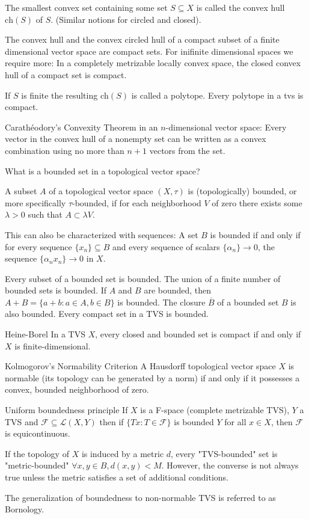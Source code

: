 The smallest convex set containing some set \( S \subseteq X \) is called the convex hull \( \text{ch}(S) \) of \( S \).
(Similar notions for circled and closed).

The convex hull and the convex circled hull of a compact subset
of a finite dimensional vector space are compact sets.
For inifinite dimensional spaces we require more:
In a completely metrizable locally convex space, 
the closed convex hull of a compact set is compact.

If \( S \) is finite the resulting \( \text{ch}(S) \) is called a polytope.
Every polytope in a tvs is compact.

Carathéodory’s Convexity Theorem in an \( n \)-dimensional vector space:
Every vector in the convex hull of a nonempty set can be written as a convex
combination using no more than \( n+1 \) vectors from the set.



What is a bounded set in a topological vector space?

A subset \( A \) of a topological vector space \( (X, \tau) \) is (topologically)
bounded, or more speciﬁcally \( \tau \)-bounded, if for each neighborhood \( V \) of zero
there exists some \( \lambda > 0 \) such that \( A \subset \lambda V \).

This can also be characterized with sequences:
A set \( B \) is bounded if and only if for every sequence \(\{x_n\} \subseteq B\) 
and every sequence of scalars \(\{\alpha_n\} \to 0\), the sequence \(\{\alpha_n x_n\} \to 0\) in \( X \).

Every subset of a bounded set is bounded.
The union of a finite number of bounded sets is bounded.
If \( A \) and \( B \) are bounded, then \(A + B = \{a + b : a \in A, b \in B\}\) is bounded.
The closure \(\overline{B}\) of a bounded set \( B \) is also bounded.
Every compact set in a TVS is bounded. 

Heine-Borel
In a TVS \( X \), every closed and bounded set is compact if and only if \( X \) is finite-dimensional.

Kolmogorov’s Normability Criterion
A Hausdorff topological vector space \( X \) is normable 
(its topology can be generated by a norm) if and only if it 
possesses a convex, bounded neighborhood of zero.

Uniform boundedness principle
If \( X \) is a F-space (complete metrizable TVS), \( Y \) a TVS and \( \mathcal{F} \subseteq \mathcal{L}(X, Y) \)
then if \( \{ T x : T \in \mathcal{F}\}  \) is bounded \( Y \) for all \( x \in X \), then \( \mathcal{F} \) is equicontinuous.

If the topology of \( X \) is induced by a metric \( d \), every "TVS-bounded" set is "metric-bounded" \(\forall x, y \in B, d(x, y) < M \). 
However, the converse is not always true unless the metric satisfies a set of additional conditions.

The generalization of boundedness to non-normable TVS is referred to as Bornology.


